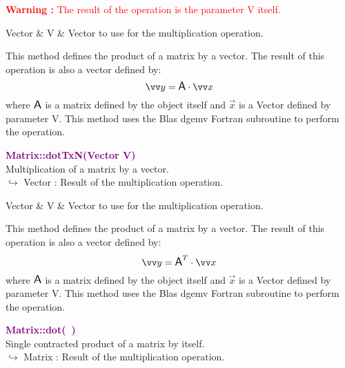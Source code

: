 \hspace*{10mm}\textcolor{red}{\textbf{Warning :}  The result of the operation is the parameter V itself.}

\begin{tcolorbox}[width=\textwidth,myArgs,tabularx={ll|R}]
Vector & V & Vector to use for the multiplication operation.
\end{tcolorbox}

This method defines the product of a matrix by a vector.
The result of this operation is also a vector defined by:
\begin{equation*}
\overrightarrow{y} = \A \cdot \overrightarrow{x}
\end{equation*}
where $\mbox{\large\ensuremath{\mathsf{A}}}$ is a matrix defined by the object itself and $\overrightarrow{x}$ is a Vector defined by parameter V.
This method uses the Blas \textsf{dgemv} Fortran subroutine to perform the operation.

\textcolor{purple}{\textbf{Matrix::dotTxN(Vector V)}}\label{Matrix::dotTxN(Vector V)}\\
Multiplication of a matrix by a vector.\\ \hspace*{10mm}$\hookrightarrow$ Vector : Result of the multiplication operation.

\begin{tcolorbox}[width=\textwidth,myArgs,tabularx={ll|R}]
Vector & V & Vector to use for the multiplication operation.
\end{tcolorbox}

This method defines the product of a matrix by a vector.
The result of this operation is also a vector defined by:
\begin{equation*}
\overrightarrow{y} = \A^T \cdot \overrightarrow{x}
\end{equation*}
where $\mbox{\large\ensuremath{\mathsf{A}}}$ is a matrix defined by the object itself and $\overrightarrow{x}$ is a Vector defined by parameter V.
This method uses the Blas \textsf{dgemv} Fortran subroutine to perform the operation.

\textcolor{purple}{\textbf{Matrix::dot(~)}}\label{Matrix::dot()}\\
Single contracted product of a matrix by itself.\\ \hspace*{10mm}$\hookrightarrow$ Matrix : Result of the multiplication operation.

